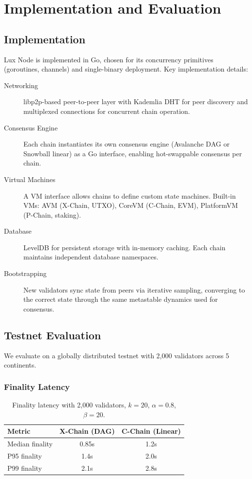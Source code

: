 \section{Implementation and Evaluation}
\label{sec:implementation}

\subsection{Implementation}

Lux Node is implemented in Go, chosen for its concurrency primitives (goroutines, channels) and single-binary deployment. Key implementation details:

\begin{description}
    \item[Networking] libp2p-based peer-to-peer layer with Kademlia DHT for peer discovery and multiplexed connections for concurrent chain operation.
    \item[Consensus Engine] Each chain instantiates its own consensus engine (Avalanche DAG or Snowball linear) as a Go interface, enabling hot-swappable consensus per chain.
    \item[Virtual Machines] A VM interface allows chains to define custom state machines. Built-in VMs: AVM (X-Chain, UTXO), CoreVM (C-Chain, EVM), PlatformVM (P-Chain, staking).
    \item[Database] LevelDB for persistent storage with in-memory caching. Each chain maintains independent database namespaces.
    \item[Bootstrapping] New validators sync state from peers via iterative sampling, converging to the correct state through the same metastable dynamics used for consensus.
\end{description}

\subsection{Testnet Evaluation}

We evaluate on a globally distributed testnet with 2,000 validators across 5 continents.

\subsubsection{Finality Latency}

\begin{table}[h]
\centering
\begin{tabular}{@{}lcc@{}}
\toprule
\textbf{Metric} & \textbf{X-Chain (DAG)} & \textbf{C-Chain (Linear)} \\
\midrule
Median finality & 0.85s & 1.2s \\
P95 finality & 1.4s & 2.0s \\
P99 finality & 2.1s & 2.8s \\
\bottomrule
\end{tabular}
\caption{Finality latency with 2,000 validators, $k=20$, $\alpha=0.8$, $\beta=20$.}
\end{table}

